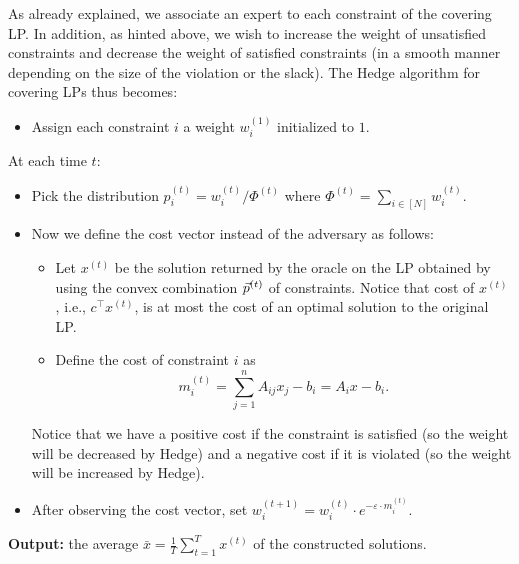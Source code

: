 As already explained, we associate an expert to each constraint of the covering LP. In addition, as
hinted above, we wish to increase the weight of unsatisfied constraints and decrease the weight of
satisfied constraints (in a smooth manner depending on the size of the violation or the slack). The
Hedge algorithm for covering LPs thus becomes:
\begin{itemize}
  \item Assign each constraint $i$ a weight $w_i^{(1)}$ initialized to $1$.
\end{itemize}
At each time $t$:
\begin{itemize}
  \item Pick the distribution $p_i^{(t)}=w_i^{(t)}/\Phi^{(t)}$ where $\Phi^{(t)}=\sum_{i\in[N]}w_i^{(t)}$.
  \item Now we define the cost vector instead of the adversary as follows:
  \begin{itemize}
    \item Let $x^{(t)}$ be the solution returned by the oracle on the LP obtained by using the
      convex combination $\vec{p}^{(t)}$ of constraints. Notice that cost of $x^{(t)}$, i.e.,
      $c^{\top}x^{(t)}$, is at most the cost of an optimal solution to the original LP.
    \item Define the cost of constraint $i$ as
      \[
        m_i^{(t)}=\sum_{j=1}^n A_{ij}x_j-b_i=A_i x-b_i.
      \]
  \end{itemize}
  Notice that we have a positive cost if the constraint is satisfied (so the weight will be
  decreased by Hedge) and a negative cost if it is violated (so the weight will be increased by
  Hedge).
  \item After observing the cost vector, set $w_i^{(t+1)}=w_i^{(t)}\cdot e^{-\varepsilon\cdot m_i^{(t)}}$.
\end{itemize}
\textbf{Output:} the average $\bar x=\frac1T\sum_{t=1}^T x^{(t)}$ of the constructed solutions.


